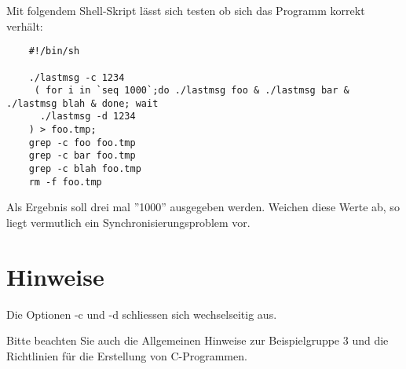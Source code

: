 \documentclass{article}
\begin{document}
Mit folgendem Shell-Skript lässt sich testen ob sich das Programm korrekt
verhält:

\begin{verbatim}
	#!/bin/sh

	./lastmsg -c 1234
	 ( for i in `seq 1000`;do ./lastmsg foo & ./lastmsg bar & ./lastmsg blah & done; wait
	  ./lastmsg -d 1234 
	) > foo.tmp;
	grep -c foo foo.tmp
	grep -c bar foo.tmp
	grep -c blah foo.tmp
	rm -f foo.tmp
\end{verbatim}

Als Ergebnis soll drei mal ''1000'' ausgegeben werden. Weichen diese Werte
ab, so liegt vermutlich ein Synchronisierungsproblem vor.

\section*{Hinweise}

Die Optionen -c und -d schliessen sich wechselseitig aus.

Bitte beachten Sie auch die Allgemeinen Hinweise zur Beispielgruppe 3
und die Richtlinien für die Erstellung von C-Programmen.
\end{document}
